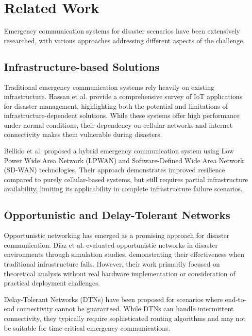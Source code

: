 \documentclass[conference]{IEEEtran}
\begin{document}
\section{Related Work}

Emergency communication systems for disaster scenarios have been extensively researched, with various approaches addressing different aspects of the challenge.

\subsection{Infrastructure-based Solutions}

Traditional emergency communication systems rely heavily on existing infrastructure. Hassan et al. \cite{Hassan2017} provide a comprehensive survey of IoT applications for disaster management, highlighting both the potential and limitations of infrastructure-dependent solutions. While these systems offer high performance under normal conditions, their dependency on cellular networks and internet connectivity makes them vulnerable during disasters.

Bellido et al. \cite{Bellido2023} proposed a hybrid emergency communication system using Low Power Wide Area Network (LPWAN) and Software-Defined Wide Area Network (SD-WAN) technologies. Their approach demonstrates improved resilience compared to purely cellular-based systems, but still requires partial infrastructure availability, limiting its applicability in complete infrastructure failure scenarios.

\subsection{Opportunistic and Delay-Tolerant Networks}

Opportunistic networking has emerged as a promising approach for disaster communication. Diaz et al. \cite{Diaz2012} evaluated opportunistic networks in disaster environments through simulation studies, demonstrating their effectiveness when traditional infrastructure fails. However, their work primarily focused on theoretical analysis without real hardware implementation or consideration of practical deployment challenges.

Delay-Tolerant Networks (DTNs) have been proposed for scenarios where end-to-end connectivity cannot be guaranteed. While DTNs can handle intermittent connectivity, they typically require sophisticated routing algorithms and may not be suitable for time-critical emergency communications.
\end{document}
